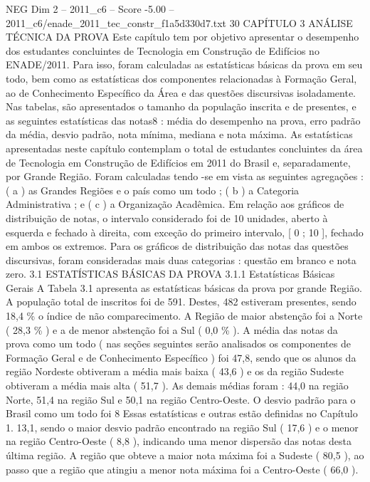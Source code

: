 \begin{textsample}{NEG Dim 2 – 2011\_c6 – Score -5.00 – 2011\_c6/enade\_2011\_tec\_constr\_f1a5d330d7.txt}  \label{ex:f2_neg_024}
30 CAPÍTULO 3 ANÁLISE TÉCNICA DA PROVA Este capítulo tem por objetivo apresentar o desempenho dos estudantes concluintes de Tecnologia em Construção de Edifícios no ENADE/2011.
Para isso, foram calculadas as estatísticas básicas da prova em seu todo, bem como as estatísticas dos componentes relacionadas à Formação Geral, ao de Conhecimento Específico da Área e das questões discursivas isoladamente.
Nas tabelas, são apresentados o tamanho da população inscrita e de presentes, e as seguintes estatísticas das notas8 : média do desempenho na prova, erro padrão da média, desvio padrão, nota mínima, mediana e nota máxima.
As estatísticas apresentadas neste capítulo contemplam o total de estudantes concluintes da área de Tecnologia em Construção de Edifícios em 2011 do Brasil e, separadamente, por Grande Região.
Foram calculadas tendo -se em vista as seguintes agregações : ( a ) as Grandes Regiões e o país como um todo ; ( b ) a Categoria Administrativa ; e ( c ) a Organização Acadêmica.
Em relação aos gráficos de distribuição de notas, o intervalo considerado foi de 10 unidades, aberto à esquerda e fechado à direita, com exceção do primeiro intervalo, [ 0 ; 10 ], fechado em ambos os extremos.
Para os gráficos de distribuição das notas das questões discursivas, foram consideradas mais duas categorias : questão em branco e nota zero. 3.1 ESTATÍSTICAS BÁSICAS DA PROVA 3.1.1 Estatísticas Básicas Gerais A Tabela 3.1 apresenta as estatísticas básicas da prova por grande Região.
A população total de inscritos foi de 591.
Destes, 482 estiveram presentes, sendo 18,4 \% o índice de não comparecimento.
A Região de maior abstenção foi a Norte ( 28,3 \% ) e a de menor abstenção foi a Sul ( 0,0 \% ).
A média das notas da prova como um todo ( nas seções seguintes serão analisados os componentes de Formação Geral e de Conhecimento Específico ) foi 47,8, sendo que os alunos da região Nordeste obtiveram a média mais baixa ( 43,6 ) e os da região Sudeste obtiveram a média mais alta ( 51,7 ).
As demais médias foram : 44,0 na região Norte, 51,4 na região Sul e 50,1 na região Centro-Oeste.
O desvio padrão para o Brasil como um todo foi 8 Essas estatísticas e outras estão definidas no Capítulo 1. 13,1, sendo o maior desvio padrão encontrado na região Sul ( 17,6 ) e o menor na região Centro-Oeste ( 8,8 ), indicando uma menor dispersão das notas desta última região.
A região que obteve a maior nota máxima foi a Sudeste ( 80,5 ), ao passo que a região que atingiu a menor nota máxima foi a Centro-Oeste ( 66,0 ).

\end{textsample}
